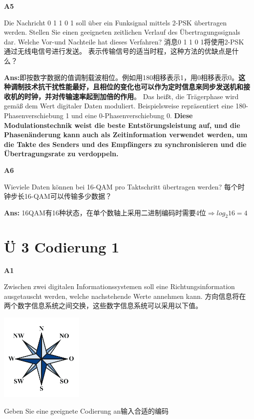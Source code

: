 \documentclass[fleqn]{article}
\begin{document}
\noindent\textbf{A5}

Die Nachricht 0 1 1 0 1 soll über ein Funksignal mittels 2-PSK übertragen werden. Stellen Sie einen geeigneten zeitlichen Verlauf des Übertragungssignals dar. Welche Vor-und Nachteile hat dieses Verfahren?
消息0 1 1 0 1将使用2-PSK通过无线电信号进行发送。 表示传输信号的适当时程，这种方法的优缺点是什么？

\textbf{Ans:}即按数字数据的值调制载波相位。例如用180相移表示1，用0相移表示0。{\bfseries 这种调制技术抗干扰性能最好，且相位的变化也可以作为定时信息来同步发送机和接收机的时钟，并对传输速率起到加倍的作用}。
Das heißt, die Trägerphase wird gemäß dem Wert digitaler Daten moduliert. Beispielsweise repräsentiert eine 180-Phasenverschiebung 1 und eine 0-Phasenverschiebung 0. {\bfseries Diese Modulationstechnik weist die beste Entstörungsleistung auf, und die Phasenänderung kann auch als Zeitinformation verwendet werden, um die Takte des Senders und des Empfängers zu synchronisieren und die Übertragungsrate zu verdoppeln.}


\noindent\textbf{A6}

Wieviele Daten können bei 16-QAM pro Taktschritt übertragen werden?
每个时钟步长16-QAM可以传输多少数据？

\textbf{Ans:} 16QAM有16种状态，在单个数轴上采用二进制编码时需要4位$\Rightarrow log_2 16 = 4$

\section{Ü 3 Codierung 1}

\noindent\textbf{A1}

Zwischen zwei digitalen Informationssystemen soll eine Richtungsinformation ausgetauscht werden, welche nachstehende Werte annehmen kann.
方向信息将在两个数字信息系统之间交换，这些数字信息系统可以采用以下值。

\begin{center}
    \includegraphics[scale=0.5]{bild8.png}
\end{center}

Geben Sie eine geeignete Codierung an输入合适的编码
\end{document}
